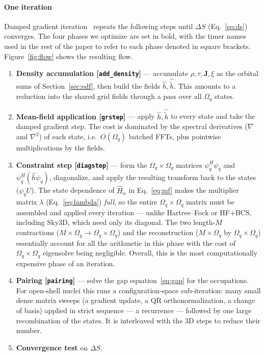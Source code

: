 \documentclass[preprint,12pt]{elsarticle}
\numberwithin{equation}{section}
\begin{document}
\paragraph{One iteration}
Damped gradient iteration~\cite{blum} repeats the following steps until $\Delta S$ (Eq.~\eqref{eq:ds}) converges. The four phases we optimize are set in bold, with the timer names used in the rest of the paper to refer to each phase denoted in square brackets. Figure~\ref{fig:flow} shows the resulting flow.
\begin{enumerate}
\item \textbf{Density accumulation [\texttt{add\_density}]} --- accumulate $\rho,\tau,\mathbf J,\xi$ as the orbital sums of Section~\ref{sec:edf}, then build the fields $\hat h,\hat{\tilde h}$. This amounts to a reduction into the shared grid fields through a pass over all $\Omega_q$ states.
\item \textbf{Mean-field application [\texttt{grstep}]} --- apply $\hat h,\hat{\tilde h}$ to every state and take the damped gradient step. The cost is dominated by the spectral derivatives ($\nabla$ and $\nabla^2$) of each state, i.e.\ $O(\Omega_q)$ batched FFTs, plus pointwise multiplications by the fields.
\item \textbf{Constraint step [\texttt{diagstep}]} --- form the $\Omega_q\times\Omega_q$ matrices $\psi_q^H\psi_q$ and $\psi_q^H(\hat h\psi_q)$, diagonalize, and apply the resulting transform back to the states ($\psi_q U$). The state dependence of $\hat H_\alpha$ in Eq.~\eqref{eq:mf} makes the multiplier matrix $\lambda$ (Eq.~\eqref{eq:lambda}) \emph{full}, so the entire $\Omega_q\times\Omega_q$ matrix must be assembled and applied every iteration --- unlike Hartree--Fock or HF+BCS, including Sky3D, which need only its diagonal. The two length-$M$ contractions ($M\times\Omega_q\to\Omega_q\times\Omega_q$) and the reconstruction ($M\times\Omega_q$ by $\Omega_q\times\Omega_q$) essentially account for all the arithmetic in this phase with the cost of  $\Omega_q\times\Omega_q$ eigensolve being negligible. Overall, this is the most computationally expensive phase of an iteration.
\item \textbf{Pairing [\texttt{pairing}]} --- solve the gap equation~\eqref{eq:gap} for the occupations. For open-shell nuclei this runs a configuration-space sub-iteration: many small dense matrix sweeps (a gradient update, a QR orthonormalization, a change of basis) applied in strict sequence --- a recurrence --- followed by one large recombination of the states. It is interleaved with the 3D steps to reduce their number.
\item \textbf{Convergence test} on $\Delta S$.
\end{enumerate}
\end{document}
